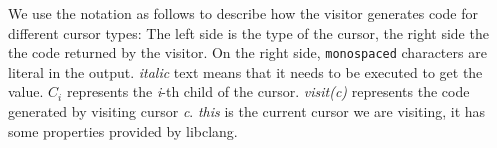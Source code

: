 \documentclass{sfuthesis}
\begin{document}
We use the notation as follows to describe how the visitor generates code for different cursor types: The left side is the type of the cursor, the right side the the code returned by the visitor. On the right side, \texttt{monospaced} characters are literal in the output. \textit{italic} text means that it needs to be executed to get the value. $C_{i}$ represents the \emph{i}-th child of the cursor. \emph{visit(c)} represents the code generated by visiting cursor \emph{c}. \emph{this} is the current cursor we are visiting, it has some properties provided by libclang. 


\newcommand{\visitchild}[1]{\textit{visit($C_{#1}$)}}
\end{document}
